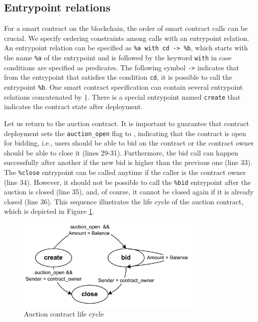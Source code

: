 \documentclass[a4paper,USenglish,cleveref, autoref, thm-restate]{lipics-v2021}
\begin{document}
\subsection{Entrypoint relations}
\label{sec:entrypoint-relations}


For a smart contract on the blockchain, the order of smart contract
calls can be crucial. We specify ordering constraints among calls with
an entrypoint relation. An entrypoint relation can be specified as
\lstinline/%a with cd -> %b/, which starts with the name
\lstinline/%a/ of the entrypoint and is followed by the keyword
\lstinline/with/ in case conditions are specified as predicates. The
following symbol \lstinline/->/ indicates that from the entrypoint
that satisfies the condition \lstinline/cd/, it is possible  to call
the entrypoint \lstinline/%b/. One smart contract specification can
contain several entrypoint relations concatenated by
\lstinline/|/. There is a special entrypoint named \lstinline/create/
that indicates the contract state after deployment. 

Let us return to the auction contract. It is important to guarantee
that contract deployment sets the  \lstinline/auction_open/ flag to
\TRUE, indicating that the contract is open for bidding, i.e., users
should be able to bid on the contract or the contract owner should be
able to close it (lines 29-31). Furthermore, the bid call can happen
successfully after another if the new bid is higher than the previous
one (line 33). The  \lstinline/%close/ entrypoint can be called
anytime if the caller is the contract owner (line 34). However, it
should not be possible to call the  \lstinline/%bid/ entrypoint after
the auction is closed (line 35), and, of course, it cannot be closed
again if it is already closed (line 36). This sequence  illustrates
the life cycle of the auction contract, which is depicted in Figure
\ref{fig:auction-life-cycle}.

\begin{figure}[tp]
    \centering
    \includegraphics[width=0.8\textwidth]{auction-life-cycle}
    \caption{Auction contract life cycle}
    \label{fig:auction-life-cycle}
\end{figure}
\end{document}

